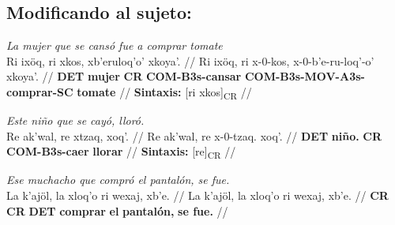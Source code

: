 \documentclass{article}%
\begin{document}
\subsection{Modificando al sujeto:}%
\label{subsec:Modificandoalsujeto}%

%
\par\medskip%
\ex
\textit{La mujer que se cansó fue a comprar tomate} \\
\begingl
\gla Ri ixöq, ri xkos, xb'eruloq'o' xkoya'. //
\glb Ri ixöq, ri x-0-kos, x-0-b'e-ru-loq'-o' xkoya'. //
\glc \textbf{DET} \textbf{mujer} \textbf{CR} \textbf{COM-}\textbf{B3s-}\textbf{cansar} \textbf{COM-}\textbf{B3s-}\textbf{MOV-}\textbf{A3s-}\textbf{comprar-}\textbf{SC} \textbf{tomate} //
\glft \textbf{Sintaxis:} [ri xkos]\textsubscript{CR} //
\endgl
\xe
%
\medskip%
\par\medskip%
\ex
\textit{Este niño que se cayó, lloró.} \\
\begingl
\gla Re ak'wal, re xtzaq, xoq'. //
\glb Re ak'wal, re x-0-tzaq. xoq'. //
\glc \textbf{DET} \textbf{niño.} \textbf{CR} \textbf{COM-}\textbf{B3s-}\textbf{caer} \textbf{llorar} //
\glft \textbf{Sintaxis:} [re]\textsubscript{CR} //
\endgl
\xe
%
\medskip%
\par\medskip%
\ex
\textit{Ese muchacho que compró el pantalón, se fue.} \\
\begingl
\gla La k'ajöl, la xloq'o ri wexaj, xb'e. //
\glb La k'ajöl, la xloq'o ri wexaj, xb'e. //
\glc \textbf{CR} \textbf{CR} \textbf{DET} \textbf{comprar} \textbf{el} \textbf{pantalón,} \textbf{se fue.} //
\endgl
\xe
%
\medskip

%
\end{document}
